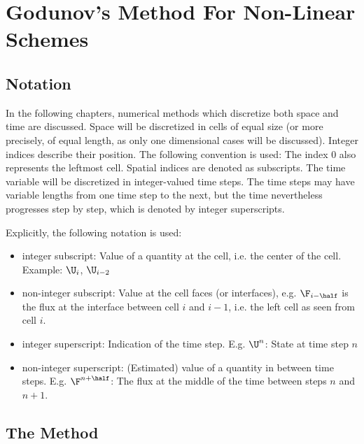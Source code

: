 \chapter{Godunov's Method For Non-Linear Schemes}\label{chap:godunov}


\section{Notation}


In the following chapters, numerical methods which discretize both space and time are discussed.
Space will be discretized in cells of equal size (or more precisely, of equal length, as only one
dimensional cases will be discussed). Integer indices describe their position. The following
convention is used: The index $0$ also represents the leftmost cell. Spatial indices are denoted as
subscripts. The time variable will be discretized in integer-valued time steps. The time steps may
have variable lengths from one time step to the next, but the time nevertheless progresses step by
step, which is denoted by integer superscripts.

Explicitly, the following notation is used:

\begin{itemize}
\item integer subscript: Value of a quantity at the cell, i.e. the center of the cell. Example:
$\U_i$, $\U_{i-2}$
\item non-integer subscript: Value at the cell faces (or interfaces), e.g. $\F_{i-\half}$ is
the flux at the interface between cell $i$ and $i-1$, i.e. the left cell as seen from cell $i$.
\item integer superscript: Indication of the time step. E.g. $\U ^ n$: State at time step $n$
\item non-integer superscript: (Estimated) value of a quantity in between time steps. E.g.
$\F^{n + \half}$: The flux at the middle of the time between steps $n$ and $n + 1$.
\end{itemize}




\section{The Method}


